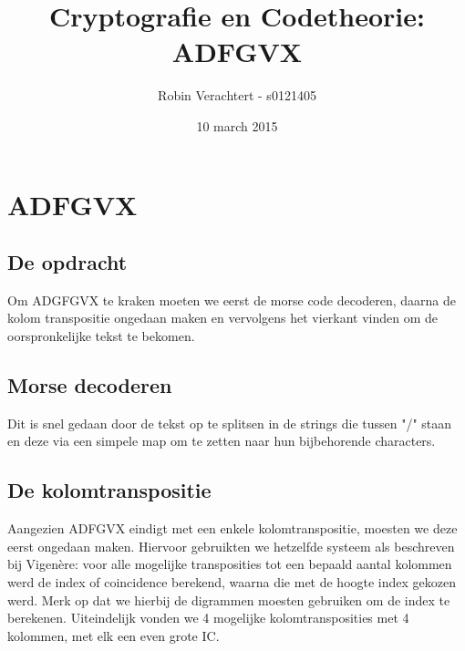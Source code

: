 \documentclass[a4paper,11pt]{article}
\author{Robin Verachtert - s0121405}
\title{Cryptografie en Codetheorie: \\ADFGVX}
\date{10 march 2015}
\begin{document}
\section{ADFGVX}
\subsection{De opdracht}
Om ADGFGVX te kraken moeten we eerst de morse code decoderen, daarna de kolom transpositie ongedaan maken en vervolgens het vierkant vinden om de oorspronkelijke tekst te bekomen.

\subsection{Morse decoderen}
Dit is snel gedaan door de tekst op te splitsen in de strings die tussen "/" staan en deze via een simpele map om te zetten naar hun bijbehorende characters.

\subsection{De kolomtranspositie}
Aangezien ADFGVX eindigt met een enkele kolomtranspositie, moesten we deze eerst ongedaan maken. Hiervoor gebruikten we hetzelfde systeem als beschreven bij Vigenère: voor alle mogelijke transposities tot een bepaald aantal kolommen werd de index of coincidence berekend, waarna die met de hoogte index gekozen werd. Merk op dat we hierbij de digrammen moesten gebruiken om de index te berekenen. Uiteindelijk vonden we 4 mogelijke kolomtransposities met 4 kolommen, met elk een even grote IC.
\end{document}

